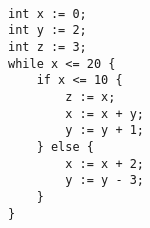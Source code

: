     \begin{lstlisting}[]  % Start your code-block

int x := 0;
int y := 2;
int z := 3;
while x <= 20 {
    if x <= 10 {
        z := x;
        x := x + y;
        y := y + 1;
    } else {
        x := x + 2;
        y := y - 3;
    }
}
	\end{lstlisting}